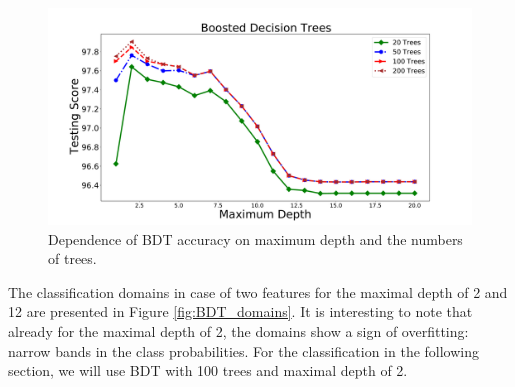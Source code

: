 \begin{figure}[h]
\includegraphics[width=\twopicsp\textwidth]{plots/bdt_train.pdf}
\caption{Dependence of BDT accuracy on maximum depth and the numbers of trees.}
\label{fig:BDT_depth}
\end{figure}

The classification domains in case of two features for the maximal depth of 2 and 12 are presented in Figure \ref{fig:BDT_domains}. 
It is interesting to note that already for the maximal depth of 2, the domains show a sign of overfitting: narrow bands in the class probabilities. For the classification in the following section, we will use BDT with 100 trees and maximal depth of 2.

